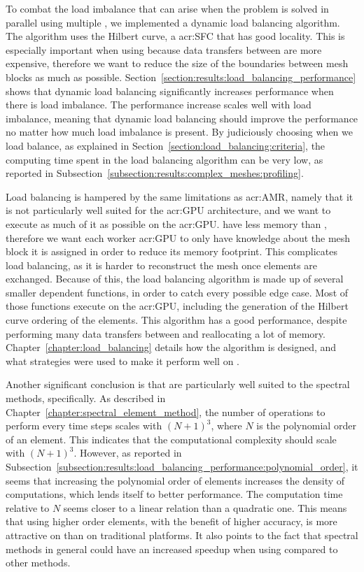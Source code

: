 To combat the load imbalance that can arise when the problem is solved in parallel using multiple
, we implemented a dynamic load balancing algorithm. The algorithm uses the
Hilbert curve, a \acrlong{acr:SFC} that has good locality. This is especially important when using
 because data transfers between  are more expensive,
therefore we want to reduce the size of the boundaries between mesh blocks as much as possible.
Section~\ref{section:results:load_balancing_performance} shows that dynamic load balancing
significantly increases performance when there is load imbalance. The performance increase scales
well with load imbalance, meaning that dynamic load balancing should improve the performance no
matter how much load imbalance is present. By judiciously choosing when we load balance, as
explained in Section~\ref{section:load_balancing:criteria}, the computing time spent in the load
balancing algorithm can be very low, as reported in
Subsection~\ref{subsection:results:complex_meshes:profiling}. 

Load balancing is hampered  by the same limitations as \acrshort{acr:AMR}, namely that it is not
particularly well suited for the \acrshort{acr:GPU} architecture, and we want to execute as much of
it as possible on the \acrshort{acr:GPU}.  have less memory than
, therefore we want each worker \acrshort{acr:GPU} to only have knowledge about
the mesh block it is assigned in order to reduce its memory footprint. This complicates load
balancing, as it is harder to reconstruct the mesh once elements are exchanged. Because of this, the
load balancing algorithm is made up of several smaller dependent functions, in order to catch every
possible edge case. Most of those functions execute on the \acrshort{acr:GPU}, including the
generation of the Hilbert curve ordering of the elements. This algorithm has a good performance,
despite performing many data transfers between  and reallocating a lot of
memory. Chapter~\ref{chapter:load_balancing} details how the algorithm is designed, and what
strategies were used to make it perform well on .

Another significant conclusion is that  are particularly well suited to the
spectral methods, specifically. As described in Chapter~\ref{chapter:spectral_element_method}, the
number of operations to perform every time steps scales with \({\left( N + 1 \right)}^3\), where
\(N\) is the polynomial order of an element. This indicates that the computational complexity should
scale with \({\left( N + 1 \right)}^3\). However, as reported in
Subsection~\ref{subsection:results:load_balancing_performance:polynomial_order}, it seems that
increasing the polynomial order of elements increases the density of computations, which lends
itself to better performance. The computation time relative to \(N\) seems closer to a linear
relation than a quadratic one. This means that using higher order elements, with the benefit of
higher accuracy, is more attractive on  than on traditional platforms. It also
points to the fact that spectral methods in general could have an increased speedup when using
 compared to other methods.

